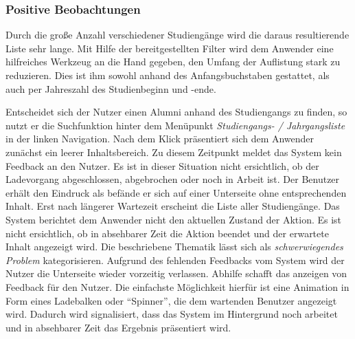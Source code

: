 
\subsubsection*{Positive Beobachtungen}
Durch die große Anzahl verschiedener Studiengänge wird die daraus resultierende Liste sehr lange. Mit Hilfe der bereitgestellten Filter wird dem Anwender eine hilfreiches Werkzeug an die Hand gegeben, den Umfang der Auflistung stark zu reduzieren. Dies ist ihm sowohl anhand des Anfangsbuchstaben gestattet, als auch per Jahreszahl des Studienbeginn und -ende. 

{
	Entscheidet sich der Nutzer einen Alumni anhand des Studiengangs zu finden, so nutzt er die Suchfunktion hinter dem Menüpunkt \emph{Studiengangs- / Jahrgangsliste} in der linken Navigation. Nach dem Klick präsentiert sich dem Anwender zunächst ein leerer Inhaltsbereich. Zu diesem Zeitpunkt meldet das System kein Feedback an den Nutzer. Es ist in dieser Situation nicht ersichtlich, ob der Ladevorgang abgeschlossen, abgebrochen oder noch in Arbeit ist. Der Benutzer erhält den Eindruck als befände er sich auf einer Unterseite ohne entsprechenden Inhalt. Erst nach längerer Wartezeit erscheint die Liste aller Studiengänge.
}
{
	Das System berichtet dem Anwender nicht den aktuellen Zustand der Aktion. Es ist nicht ersichtlich, ob in absehbarer Zeit die Aktion beendet und der erwartete Inhalt angezeigt wird. 
	Die beschriebene Thematik lässt sich als \emph{schwerwiegendes Problem} kategorisieren. Aufgrund des fehlenden Feedbacks vom System wird der Nutzer die Unterseite wieder vorzeitig verlassen. 
}
{
	Abhilfe schafft das anzeigen von Feedback für den Nutzer. Die einfachste Möglichkeit hierfür ist eine Animation in Form eines Ladebalken oder “Spinner”, die dem wartenden Benutzer angezeigt wird. Dadurch wird signalisiert, dass das System im Hintergrund noch arbeitet und in absehbarer Zeit das Ergebnis präsentiert wird.
}


